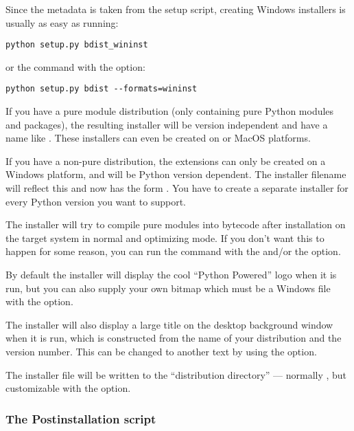 \documentclass{howto}
\begin{document}
Since the metadata is taken from the setup script, creating Windows
installers is usually as easy as running:

\begin{verbatim}
python setup.py bdist_wininst
\end{verbatim}

or the  command with the  option:

\begin{verbatim}
python setup.py bdist --formats=wininst
\end{verbatim}

If you have a pure module distribution (only containing pure Python
modules and packages), the resulting installer will be version
independent and have a name like .  These
installers can even be created on \UNIX{} or MacOS platforms.

If you have a non-pure distribution, the extensions can only be
created on a Windows platform, and will be Python version dependent.
The installer filename will reflect this and now has the form
.  You have to create a separate installer
for every Python version you want to support.

The installer will try to compile pure modules into bytecode after
installation on the target system in normal and optimizing mode.  If
you don't want this to happen for some reason, you can run the
 command with the
 and/or the
 option.

By default the installer will display the cool ``Python Powered'' logo
when it is run, but you can also supply your own bitmap which must be
a Windows  file with the  option.

The installer will also display a large title on the desktop
background window when it is run, which is constructed from the name
of your distribution and the version number.  This can be changed to
another text by using the  option.

The installer file will be written to the ``distribution directory''
--- normally , but customizable with the
 option.

\subsubsection{The Postinstallation script}
\label{postinstallation-script}
\end{document}
